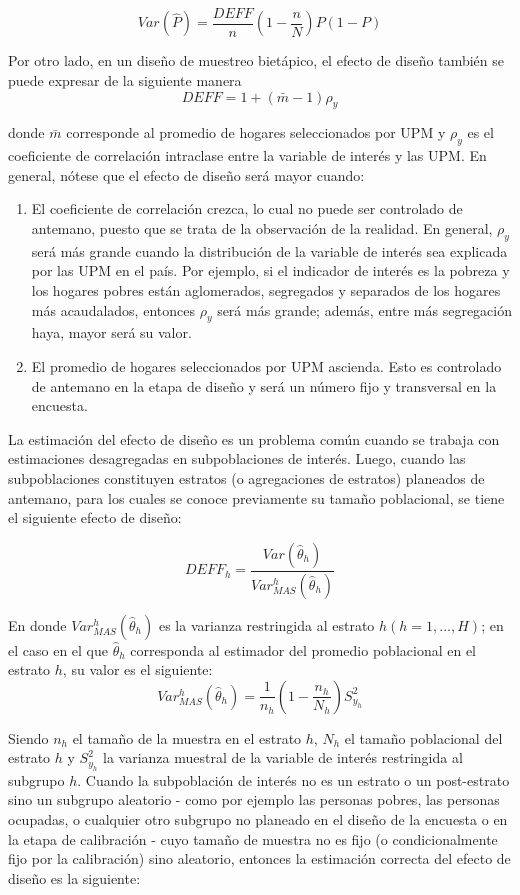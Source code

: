 \documentclass[
  12pt,
  spanish,
]{book}
\providecommand{\tightlist}{%
  \setlength{\itemsep}{0pt}\setlength{\parskip}{0pt}}
\begin{document}
\[
Var(\hat P) = \frac{DEFF}{n}\left(1-\frac{n}{N}\right)P(1-P)
\]

Por otro lado, en un diseño de muestreo bietápico, el efecto de diseño también se puede expresar de la siguiente manera
\[
DEFF = 1 + (\bar m-1)\rho_y
\]

donde \(\bar m\) corresponde al promedio de hogares seleccionados por UPM y \(\rho_y\) es el coeficiente de correlación intraclase entre la variable de interés y las UPM. En general, nótese que el efecto de diseño será mayor cuando:

\begin{enumerate}
\def\labelenumi{\arabic{enumi}.}
\tightlist
\item
  El coeficiente de correlación crezca, lo cual no puede ser controlado de antemano, puesto que se trata de la observación de la realidad. En general, \(\rho_y\) será más grande cuando la distribución de la variable de interés sea explicada por las UPM en el país. Por ejemplo, si el indicador de interés es la pobreza y los hogares pobres están aglomerados, segregados y separados de los hogares más acaudalados, entonces \(\rho_y\) será más grande; además, entre más segregación haya, mayor será su valor.
\item
  El promedio de hogares seleccionados por UPM ascienda. Esto es controlado de antemano en la etapa de diseño y será un número fijo y transversal en la encuesta.
\end{enumerate}

La estimación del efecto de diseño es un problema común cuando se trabaja con estimaciones desagregadas en subpoblaciones de interés. Luego, cuando las subpoblaciones constituyen estratos (o agregaciones de estratos) planeados de antemano, para los cuales se conoce previamente su tamaño poblacional, se tiene el siguiente efecto de diseño:

\[
DEFF_h= \frac{Var (\hat\theta_h) }{Var_{MAS}^h(\hat\theta_h) }
\]

En donde \(Var_{MAS}^h(\hat\theta_h)\) es la varianza restringida al estrato \(h (h=1,\ldots, H)\); en el caso en el que \(\hat\theta_h\) corresponda al estimador del promedio poblacional en el estrato \(h\), su valor es el siguiente:
\[
Var_{MAS}^h(\hat\theta_h)=\frac{1}{n_h}\left(1-\frac{n_h}{N_h}\right)S_{y_h}^2
\]

Siendo \(n_h\) el tamaño de la muestra en el estrato \(h\), \(N_h\) el tamaño poblacional del estrato \(h\) y \(S_{y_h}^2\) la varianza muestral de la variable de interés restringida al subgrupo \(h\). Cuando la subpoblación de interés no es un estrato o un post-estrato sino un subgrupo aleatorio - como por ejemplo las personas pobres, las personas ocupadas, o cualquier otro subgrupo no planeado en el diseño de la encuesta o en la etapa de calibración - cuyo tamaño de muestra no es fijo (o condicionalmente fijo por la calibración) sino aleatorio, entonces la estimación correcta del efecto de diseño es la siguiente:
\end{document}
